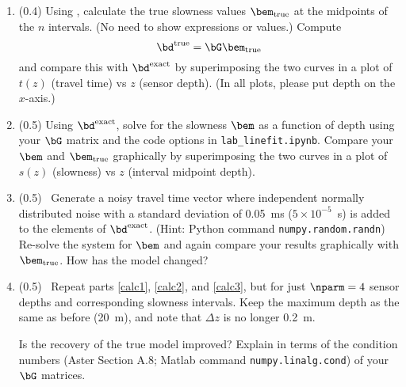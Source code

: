 \documentclass[11pt,titlepage,fleqn]{article}
\begin{document}
\begin{enumerate}
{\bf No non-integer numbers should appear in your answer.}


\item (0.4) Using , calculate the true slowness values $\bem_{\rm true}$ at the midpoints of the $n$ intervals. (No need to show expressions or values.) Compute
%
\begin{equation}
\bd^{\rm true} = \bG\bem_{\rm true}
\end{equation}
%
and compare this with $\bd^{\rm exact}$ by superimposing the two curves in a plot of $t(z)$ (travel time) vs $z$ (sensor depth). (In all plots, please put depth on the $x$-axis.)

\label{calc1}


\item (0.5) Using $\bd^{\rm exact}$, solve for the slowness $\bem$ as a function of depth using your $\bG$ matrix and the code options in \verb+lab_linefit.ipynb+. Compare your $\bem$ and $\bem_{\rm true}$  graphically by superimposing the two curves in a plot of $s(z)$ (slowness) vs $z$ (interval midpoint depth).

\label{calc2}


\item (0.5) \ptag\ Generate a noisy travel time vector where independent normally distributed noise with a standard deviation of 0.05~ms ($5 \times 10^{-5}$~s) is added to the elements of $\bd^{\rm exact}$. (Hint: Python command \verb+numpy.random.randn+) Re-solve the system for $\bem$ and again compare your results graphically with $\bem_{\rm true}$. How has the model changed?

\label{calc3}


\item (0.5) \ptag\ Repeat parts \ref{calc1}, \ref{calc2}, and \ref{calc3}, but for just $\nparm=4$ sensor depths and corresponding slowness intervals. Keep the maximum depth as the same as before (20~m), and note that $\Delta z$ is no longer 0.2~m.

Is the recovery of the true model improved? Explain in terms of the condition numbers (Aster Section A.8; Matlab command \verb+numpy.linalg.cond+) of your $\bG$ matrices.

\end{enumerate}

\end{document}
